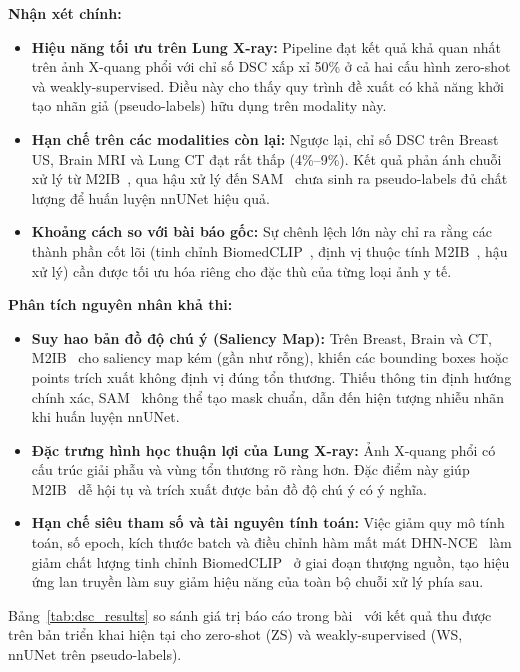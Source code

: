 \documentclass[conference]{IEEEtran}
\begin{document}
\textbf{Nhận xét chính:}

\begin{itemize}
    \item \textbf{Hiệu năng tối ưu trên Lung X-ray:} Pipeline đạt kết quả khả quan nhất trên ảnh X-quang phổi với chỉ số DSC xấp xỉ 50\% ở cả hai cấu hình zero-shot và weakly-supervised. Điều này cho thấy quy trình đề xuất có khả năng khởi tạo nhãn giả (pseudo-labels) hữu dụng trên modality này.
    \item \textbf{Hạn chế trên các modalities còn lại:} Ngược lại, chỉ số DSC trên Breast US, Brain MRI và Lung CT đạt rất thấp (4\%--9\%). Kết quả phản ánh chuỗi xử lý từ M2IB~\cite{ref7}, qua hậu xử lý đến SAM~\cite{ref2,ref4} chưa sinh ra pseudo-labels đủ chất lượng để huấn luyện nnUNet hiệu quả.
    \item \textbf{Khoảng cách so với bài báo gốc:} Sự chênh lệch lớn này chỉ ra rằng các thành phần cốt lõi (tinh chỉnh BiomedCLIP~\cite{ref3}, định vị thuộc tính M2IB~\cite{ref7}, hậu xử lý) cần được tối ưu hóa riêng cho đặc thù của từng loại ảnh y tế.
\end{itemize}

\textbf{Phân tích nguyên nhân khả thi:}

\begin{itemize}
    \item \textbf{Suy hao bản đồ độ chú ý (Saliency Map):} Trên Breast, Brain và CT, M2IB~\cite{ref7} cho saliency map kém (gần như rỗng), khiến các bounding boxes hoặc points trích xuất không định vị đúng tổn thương. Thiếu thông tin định hướng chính xác, SAM~\cite{ref2,ref4} không thể tạo mask chuẩn, dẫn đến hiện tượng nhiễu nhãn khi huấn luyện nnUNet.
    \item \textbf{Đặc trưng hình học thuận lợi của Lung X-ray:} Ảnh X-quang phổi có cấu trúc giải phẫu và vùng tổn thương rõ ràng hơn. Đặc điểm này giúp M2IB~\cite{ref7} dễ hội tụ và trích xuất được bản đồ độ chú ý có ý nghĩa.
    \item \textbf{Hạn chế siêu tham số và tài nguyên tính toán:} Việc giảm quy mô tính toán, số epoch, kích thước batch và điều chỉnh hàm mất mát DHN-NCE~\cite{ref1} làm giảm chất lượng tinh chỉnh BiomedCLIP~\cite{ref3} ở giai đoạn thượng nguồn, tạo hiệu ứng lan truyền làm suy giảm hiệu năng của toàn bộ chuỗi xử lý phía sau.
\end{itemize}

Bảng~\ref{tab:dsc_results} so sánh giá trị báo cáo trong bài~\cite{ref1} với kết quả thu được trên bản triển khai hiện tại cho zero-shot (ZS) và weakly-supervised (WS, nnUNet trên pseudo-labels).
\end{document}
